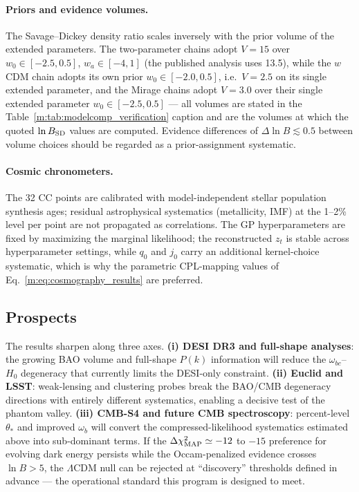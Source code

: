 \documentclass[aps,prd,preprint,superscriptaddress,nofootinbib]{revtex4-2}
\begin{document}
\paragraph{Priors and evidence volumes.} The Savage--Dickey density ratio scales inversely with the prior volume of the extended parameters. The two-parameter chains adopt $V = 15$ over $w_0 \in [-2.5, 0.5]$, $w_a \in [-4, 1]$ (the published analysis uses 13.5), while the $w$CDM chain adopts its own prior $w_0 \in [-2.0, 0.5]$, i.e.\ $V = 2.5$ on its single extended parameter, and the Mirage chains adopt $V = 3.0$ over their single extended parameter $w_0 \in [-2.5, 0.5]$ --- all volumes are stated in the Table~\ref{m:tab:modelcomp_verification} caption and are the volumes at which the quoted $\ln B_{\rm SD}$ values are computed. Evidence differences of $\Delta\ln B \lesssim 0.5$ between volume choices should be regarded as a prior-assignment systematic.

\paragraph{Cosmic chronometers.} The 32 CC points are calibrated with model-independent stellar population synthesis ages; residual astrophysical systematics (metallicity, IMF) at the 1--2\% level per point are not propagated as correlations. The GP hyperparameters are fixed by maximizing the marginal likelihood; the reconstructed $z_t$ is stable across hyperparameter settings, while $q_0$ and $j_0$ carry an additional kernel-choice systematic, which is why the parametric CPL-mapping values of Eq.~\ref{m:eq:cosmography_results} are preferred.

\subsection{Prospects}

The results sharpen along three axes. \textbf{(i) DESI DR3 and full-shape analyses}: the growing BAO volume and full-shape $P(k)$ information will reduce the $\omega_{bc}$--$H_0$ degeneracy that currently limits the DESI-only constraint. \textbf{(ii) Euclid and LSST}: weak-lensing and clustering probes break the BAO/CMB degeneracy directions with entirely different systematics, enabling a decisive test of the phantom valley. \textbf{(iii) CMB-S4 and future CMB spectroscopy}: percent-level $\theta_*$ and improved $\omega_b$ will convert the compressed-likelihood systematics estimated above into sub-dominant terms. If the $\Delta\chi^2_{\rm MAP} \simeq -12$ to $-15$ preference for evolving dark energy persists while the Occam-penalized evidence crosses $\ln B > 5$, the $\Lambda$CDM null can be rejected at ``discovery'' thresholds defined in advance --- the operational standard this program is designed to meet.
\end{document}
